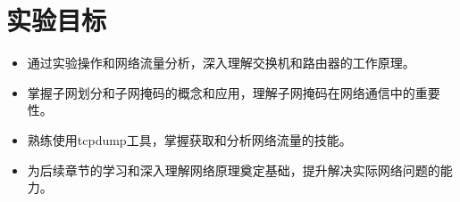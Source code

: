 \section{实验目标}
\begin{itemize}
    \item 通过实验操作和网络流量分析，深入理解交换机和路由器的工作原理。
    \item 掌握子网划分和子网掩码的概念和应用，理解子网掩码在网络通信中的重要性。
    \item 熟练使用tcpdump工具，掌握获取和分析网络流量的技能。
    \item  为后续章节的学习和深入理解网络原理奠定基础，提升解决实际网络问题的能力。
\end{itemize}